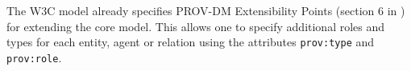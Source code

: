 The W3C model already specifies PROV-DM Extensibility Points (section 6 in
\citealt{std:W3CProvDM}) for extending the core model. This allows one to
specify additional roles and types for each entity, agent or relation using the
attributes \texttt{prov:type} and \texttt{prov:role}. 

